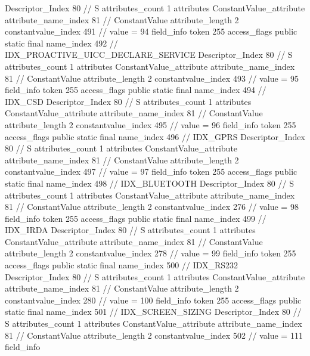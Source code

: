 {{{{{				Descriptor_Index	80		// S
				attributes_count	1
				attributes {
				ConstantValue_attribute {
					attribute_name_index	81		// ConstantValue
					attribute_length	2
					constantvalue_index	491		// value = 94
				}
				}
			}
			field_info {
				token	255
				access_flags	public static final
				name_index	492		// IDX_PROACTIVE_UICC_DECLARE_SERVICE
				Descriptor_Index	80		// S
				attributes_count	1
				attributes {
				ConstantValue_attribute {
					attribute_name_index	81		// ConstantValue
					attribute_length	2
					constantvalue_index	493		// value = 95
				}
				}
			}
			field_info {
				token	255
				access_flags	public static final
				name_index	494		// IDX_CSD
				Descriptor_Index	80		// S
				attributes_count	1
				attributes {
				ConstantValue_attribute {
					attribute_name_index	81		// ConstantValue
					attribute_length	2
					constantvalue_index	495		// value = 96
				}
				}
			}
			field_info {
				token	255
				access_flags	public static final
				name_index	496		// IDX_GPRS
				Descriptor_Index	80		// S
				attributes_count	1
				attributes {
				ConstantValue_attribute {
					attribute_name_index	81		// ConstantValue
					attribute_length	2
					constantvalue_index	497		// value = 97
				}
				}
			}
			field_info {
				token	255
				access_flags	public static final
				name_index	498		// IDX_BLUETOOTH
				Descriptor_Index	80		// S
				attributes_count	1
				attributes {
				ConstantValue_attribute {
					attribute_name_index	81		// ConstantValue
					attribute_length	2
					constantvalue_index	276		// value = 98
				}
				}
			}
			field_info {
				token	255
				access_flags	public static final
				name_index	499		// IDX_IRDA
				Descriptor_Index	80		// S
				attributes_count	1
				attributes {
				ConstantValue_attribute {
					attribute_name_index	81		// ConstantValue
					attribute_length	2
					constantvalue_index	278		// value = 99
				}
				}
			}
			field_info {
				token	255
				access_flags	public static final
				name_index	500		// IDX_RS232
				Descriptor_Index	80		// S
				attributes_count	1
				attributes {
				ConstantValue_attribute {
					attribute_name_index	81		// ConstantValue
					attribute_length	2
					constantvalue_index	280		// value = 100
				}
				}
			}
			field_info {
				token	255
				access_flags	public static final
				name_index	501		// IDX_SCREEN_SIZING
				Descriptor_Index	80		// S
				attributes_count	1
				attributes {
				ConstantValue_attribute {
					attribute_name_index	81		// ConstantValue
					attribute_length	2
					constantvalue_index	502		// value = 111
				}
				}
			}
			field_info {
}}}}}
